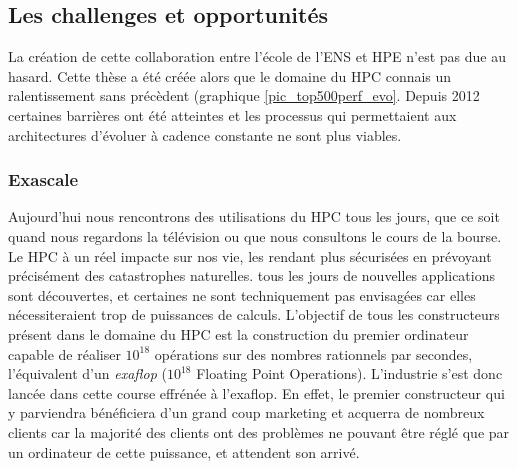 \subsection{Les challenges et opportunités}

La création de cette collaboration entre l'école de l'ENS et HPE n'est pas due au hasard. Cette thèse a été créée alors que le domaine du HPC connais un ralentissement sans précèdent (graphique \ref{pic_top500perf_evo}. Depuis 2012 certaines barrières ont été atteintes et les processus qui permettaient aux architectures d'évoluer à cadence constante ne sont plus viables. 




\subsubsection{Exascale}
Aujourd'hui nous rencontrons des utilisations du HPC tous les jours, que ce soit quand nous regardons la télévision ou que nous consultons le cours de la bourse. Le HPC à un réel impacte sur nos vie, les rendant plus sécurisées en prévoyant précisément des catastrophes naturelles. tous les jours de nouvelles applications sont découvertes, et certaines ne sont techniquement pas envisagées car elles nécessiteraient trop de puissances de calculs. L'objectif de tous les constructeurs présent dans le domaine du HPC est la construction du premier ordinateur capable de réaliser  $10^18$ opérations sur des nombres rationnels par secondes, l'équivalent d'un \textit{exaflop} ($10^18$ Floating Point Operations). L'industrie s'est donc lancée dans cette course effrénée à l'exaflop. En effet, le premier constructeur qui y parviendra bénéficiera d'un grand coup marketing et acquerra de nombreux clients car la majorité des clients ont des problèmes ne pouvant être réglé que par un ordinateur de cette puissance, et attendent son arrivé.

